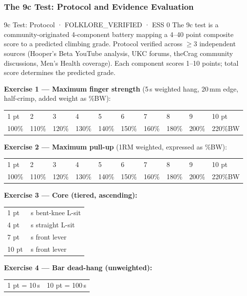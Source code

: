 \subsubsection{The 9c Test: Protocol and Evidence Evaluation}

\begin{folklorebox}{9c Test: Protocol · FOLKLORE\_VERIFIED · ESS 0}
The 9c test is a community-originated 4-component battery mapping a 4--40 point composite score to a predicted climbing grade. Protocol verified across $\geq$3 independent sources (Hooper's Beta YouTube analysis, UKC forums, theCrag community discussions, Men's Health coverage). Each component scores 1--10 points; total score determines the predicted grade.

\medskip
\noindent\textbf{Exercise 1 --- Maximum finger strength} (5\,s weighted hang, 20\,mm edge, half-crimp, added weight as \%BW):
\smallskip

\begin{tabular}{llllllllll}
1 pt & 2 & 3 & 4 & 5 & 6 & 7 & 8 & 9 & 10 pt \\
100\% & 110\% & 120\% & 130\% & 140\% & 150\% & 160\% & 180\% & 200\% & 220\%BW \\
\end{tabular}

\medskip
\noindent\textbf{Exercise 2 --- Maximum pull-up} (1RM weighted, expressed as \%BW):
\smallskip

\begin{tabular}{llllllllll}
1 pt & 2 & 3 & 4 & 5 & 6 & 7 & 8 & 9 & 10 pt \\
100\% & 110\% & 120\% & 130\% & 140\% & 150\% & 160\% & 180\% & 200\% & 220\%BW \\
\end{tabular}

\medskip
\noindent\textbf{Exercise 3 --- Core (tiered, ascending):}
\smallskip

\begin{tabular}{>{\raggedright}p{2.0cm} >{\raggedright\arraybackslash}p{10cm}}
1 pt & 10\,s bent-knee L-sit \\
4 pt & 10\,s straight L-sit \\
7 pt & 5\,s front lever \\
10 pt & 30\,s front lever \\
\end{tabular}

\medskip
\noindent\textbf{Exercise 4 --- Bar dead-hang (unweighted):}
\smallskip

\begin{tabular}{ll}
1 pt = 10\,s & 10 pt = 100\,s \\
\end{tabular}


\end{folklorebox}
